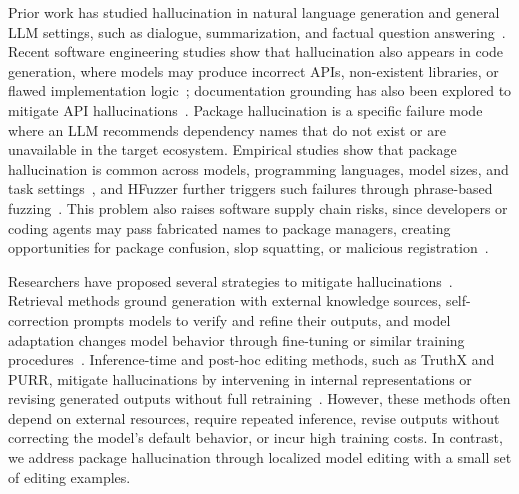 Prior work has studied hallucination in natural language generation and general LLM settings, such as dialogue, summarization, and factual question answering~\cite{ji2023survey,huang2025survey,zhang2025siren,alansari2026large}. 
Recent software engineering studies show that hallucination also appears in code generation, where models may produce incorrect APIs, non-existent libraries, or flawed implementation logic~\cite{liu2024exploring,tian2025codehalu,zhang2025llm}; documentation grounding has also been explored to mitigate API hallucinations~\cite{jain2025mitigating}. 
Package hallucination is a specific failure mode where an LLM recommends dependency names that do not exist or are unavailable in the target ecosystem. 
Empirical studies show that package hallucination is common across models, programming languages, model sizes, and task settings~\cite{spracklen2025we,krishna2025importing}, and HFuzzer further triggers such failures through phrase-based fuzzing~\cite{zhao2025hfuzzer}. 
This problem also raises software supply chain risks, since developers or coding agents may pass fabricated names to package managers, creating opportunities for package confusion, slop squatting, or malicious registration~\cite{ladisa2023sok,neupane2023beyond,kaplan2021survey,lanyado2024diving,spracklen2025we,krishna2025importing}.

Researchers have proposed several strategies to mitigate hallucinations~\cite{tonmoy2024comprehensive,alansari2026large}. 
Retrieval methods ground generation with external knowledge sources, self-correction prompts models to verify and refine their outputs, and model adaptation changes model behavior through fine-tuning or similar training procedures~\cite{jain2025mitigating,ji2023towards,madaan2023self,spracklen2025we}. 
Inference-time and post-hoc editing methods, such as TruthX and PURR, mitigate hallucinations by intervening in internal representations or revising generated outputs without full retraining~\cite{zhang2024truthx,chen2023purrefficientlyeditinglanguage}. 
However, these methods often depend on external resources, require repeated inference, revise outputs without correcting the model's default behavior, or incur high training costs. 
In contrast, we address package hallucination through localized model editing with a small set of editing examples.


